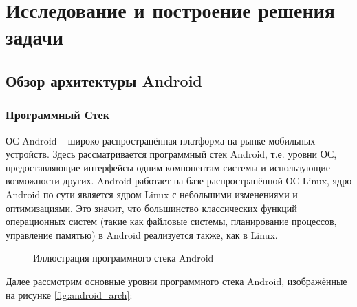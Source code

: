 \section{Исследование и построение решения задачи}

\subsection{Обзор архитектуры Android}
\subsubsection{Программный Стек}
\label{androidDesc}

ОС Android -- широко распространённая платформа на рынке мобильных
устройств. Здесь рассматривается программный стек Android, т.е. уровни
ОС, предоставляющие интерфейсы одним компонентам системы и использующие
возможности других. Android работает на базе распространённой ОС Linux, 
ядро Android по сути является ядром Linux с небольшими изменениями и
оптимизациями. Это значит, что большинство классических функций
операционных систем (такие как файловые системы, планирование процессов,
управление памятью) в Android реализуется также, как в Linux. 

\begin{figure}
\centering
{} 
\caption{Иллюстрация программного стека Android}
\end{figure}

Далее рассмотрим основные уровни программного стека Android,
изображённые на рисунке \ref{fig:android_arch}:

